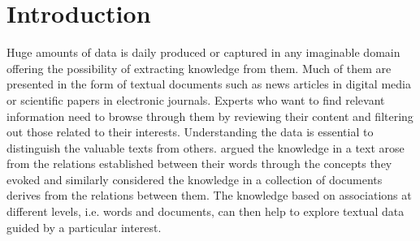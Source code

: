 

\chapter{Introduction}\label{ch:introduction}

\graphicspath{{introduction/figures/}}






Huge amounts of data is daily produced or captured in any imaginable domain offering the possibility of extracting knowledge from them. Much of them are presented in the form of textual documents such as news articles in digital media or scientific papers in electronic journals. Experts who want to find relevant information need to browse through them by reviewing their content and filtering out those related to their interests. Understanding the data is essential to distinguish the valuable texts from others. \cite{Griffiths2007} argued the knowledge in a text arose from the relations established between their words through the concepts they evoked and similarly \cite{Kenter2015} considered the knowledge in a collection of documents derives from the relations between them. The knowledge based on associations at different levels, i.e. words and documents, can then help to explore textual data guided by a particular interest.




